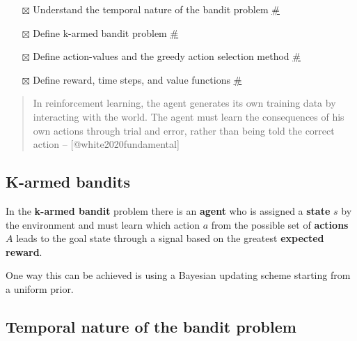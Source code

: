 \documentclass[
  letterpaper,
  DIV=11,
  numbers=noendperiod,
  oneside]{scrartcl}
\providecommand{\tightlist}{%
  \setlength{\itemsep}{0pt}\setlength{\parskip}{0pt}}\usepackage{longtable,booktabs,array}
\theoremstyle{definition}
\theoremstyle{remark}
\begin{document}
\begin{tcolorbox}[enhanced jigsaw, left=2mm, leftrule=.75mm, bottomtitle=1mm, toptitle=1mm, title=\textcolor{quarto-callout-note-color}{\faInfo}\hspace{0.5em}{Goals}, breakable, toprule=.15mm, colbacktitle=quarto-callout-note-color!10!white, coltitle=black, colback=white, opacityback=0, rightrule=.15mm, bottomrule=.15mm, colframe=quarto-callout-note-color-frame, titlerule=0mm, opacitybacktitle=0.6, arc=.35mm]

\begin{itemize}
\tightlist
\item[$\boxtimes$]
  Understand the temporal nature of the bandit problem
  \hyperref[sec-k-armed-bandit]{\#}
\item[$\boxtimes$]
  Define k-armed bandit problem \hyperref[l1g2]{\#}
\item[$\boxtimes$]
  Define action-values and the greedy action selection method
  \hyperref[sec-l1g3]{\#}
\item[$\boxtimes$]
  Define reward, time steps, and value functions \hyperref[l1g4]{\#}
\end{itemize}

\end{tcolorbox}

\begin{quote}
In reinforcement learning, the agent generates its own training data by
interacting with the world. The agent must learn the consequences of his
own actions through trial and error, rather than being told the correct
action -- {[}@white2020fundamental{]}
\end{quote}

\subsection{K-armed bandits 🐙}\label{sec-k-armed-bandit}

In the \textbf{k-armed bandit} problem there is an \textbf{agent} who is
assigned a \textbf{state} \(s\) by the environment and must learn which
action \(a\) from the possible set of \textbf{actions} \(A\) leads to
the goal state through a signal based on the greatest \textbf{expected
reward}.

One way this can be achieved is using a Bayesian updating scheme
starting from a uniform prior.

\subsection{Temporal nature of the bandit problem}\label{sec-l1g1}
\end{document}
